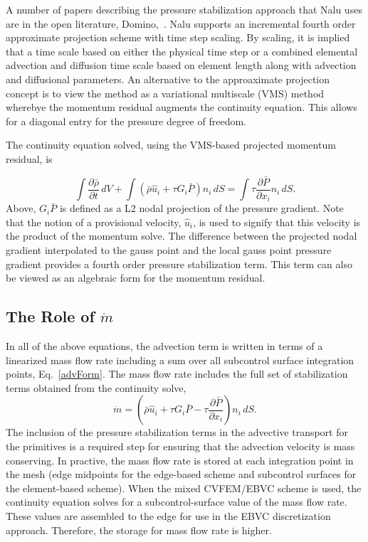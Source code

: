 A number of papers describing the pressure stabilization approach that Nalu uses are in the open literature,
Domino,~\cite{Domino:2006, Domino:2008, Domino:2014}.  Nalu supports an incremental
fourth order approximate projection scheme with time step 
scaling. By scaling, it is implied that a time scale based on either the physical time step or 
a combined elemental advection and diffusion time scale based on element length along
with advection and diffusional parameters. An alternative to the approaximate projection
concept is to view the method as a variational multiscale (VMS) method wherebye the momentum residual
augments the continuity equation. This allows for a diagonal entry for the pressure degree of freedom.

The continuity equation solved, using the VMS-based projected momentum residual, is

\begin{equation}
\int \frac{\partial \bar{\rho}} {\partial t}\, dV
+ \int \left( \bar{\rho} \hat{u}_i + \tau G_i \bar{P} \right) n_i\, dS
  = \int \tau \frac{\partial \bar{P}}{\partial x_i} n_i\, dS.
\end{equation}
%
Above, $G_i \bar{P}$ is defined as a L2 nodal projection of the pressure gradient. Note that the notion of 
a provisional velocity, $\hat u_i$, is used to signify that this velocity is the product of the momentum 
solve. The difference between the projected nodal gradient interpolated to the gauss point and the 
local gauss point pressure gradient provides a fourth order pressure stabilization
term. This term can also be viewed as an algebraic form for the momentum residual.

\subsection{The Role of $\dot m$}

In all of the above equations, the advection term is written in terms of a linearized 
mass flow rate including a sum over all subcontrol surface integration points,
Eq.~\ref{advForm}. The mass flow rate includes the full set of stabilization terms
obtained from the continuity solve,
\begin{equation}
\dot m = \left(\bar{\rho} \hat{u}_i + \tau G_i \bar{P} 
  -\tau \frac{\partial \bar{P}}{\partial x_i}\right) n_i\, dS.
\end{equation}
The inclusion of the pressure stabilization terms in the advective
transport for the primitives is a required step for ensuring that
the advection velocity is mass conserving. In practive, the mass flow
rate is stored at each integration point in the mesh (edge midpoints for the
edge-based scheme and subcontrol surfaces for the element-based scheme).
When the mixed CVFEM/EBVC scheme is used, the continuity equation solves for
a subcontrol-surface value of the mass flow rate. These values are assembled to the
edge for use in the EBVC discretization approach. Therefore, the storage for mass
flow rate is higher.

